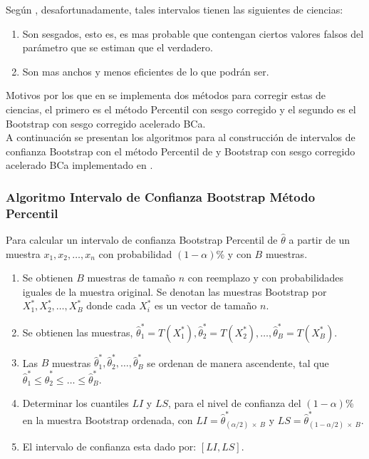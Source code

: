 Según \textcite{balam-2012}, desafortunadamente, tales intervalos tienen las siguientes de ciencias:\\

\begin{enumerate}
\item Son sesgados, esto es, es mas probable que contengan ciertos valores falsos del parámetro que se estiman que el verdadero.

\item Son mas anchos y menos eficientes de lo que podrán ser.
\end{enumerate}

Motivos por los que en \textcite{balam-2012} se implementa dos métodos para corregir estas de ciencias, el primero es el método Percentil con sesgo corregido y el segundo es el Bootstrap con sesgo corregido acelerado BCa.\\


A continuación se presentan los algoritmos para al construcción de intervalos de confianza Bootstrap con el método Percentil de \textcite{efron-1982} y Bootstrap con sesgo corregido acelerado BCa implementado en \textcite{balam-2012}.\\

\subsubsection{Algoritmo Intervalo de Confianza Bootstrap Método Percentil}

Para calcular un intervalo de confianza Bootstrap Percentil de $\hat{\theta}$ a partir de un muestra $x_{1}, x_{2}, \dots, x_{n}$ con probabilidad $(1-\alpha)$\% y con $B$ muestras.


\begin{enumerate}
\item Se obtienen $B$ muestras de tamaño $n$ con reemplazo y con probabilidades iguales de la muestra original. Se denotan las muestras Bootstrap por $X^{*}_{1}, X^{*}_{2},  \dots, X^{*}_{B}$ donde cada $X^{*}_{i}$ es un vector de tamaño $n$.

\item Se obtienen las muestras, $\hat{\theta}^{*}_{1} = T (X^{*}_{1}) , \hat{\theta}^{*}_{2} = T (X^{*}_{2}), \dots,\hat{\theta}^{*}_{B} = T (X^{*}_{B})$.

\item Las $B$ muestras $\hat{\theta}^{*}_{1}, \hat{\theta}^{*}_{2},\dots, \hat{\theta}^{*}_{B} $ se ordenan de manera ascendente, tal que $\hat{\theta}^{*}_{1} \leq \hat{\theta}^{*}_{2} \leq \dots \leq \hat{\theta}^{*}_{B} $.

\item Determinar los cuantiles $LI$ y $LS$, para el nivel de confianza del $(1-\alpha)$\% en la muestra Bootstrap ordenada, con $LI = \hat{\theta}^{*}_{ ( \alpha/2 ) \: \times \: B} $ y $LS = \hat{\theta}^{*}_{ (1 - \alpha/2) \: \times \: B} $.

\item El intervalo de confianza esta dado por: $[LI, LS]$.
\end{enumerate}






